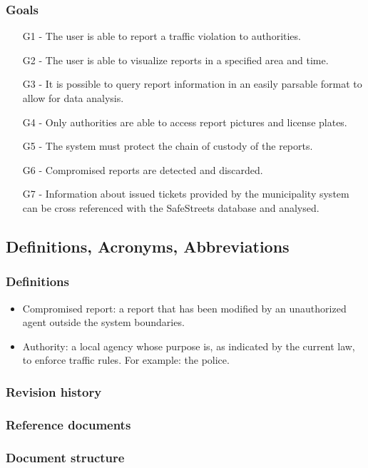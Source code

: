 \subsubsection{Goals}
\begin{itemize}
\item
[G1] - The user is able to report a traffic violation to authorities.
\item
[G2] - The user is able to visualize reports in a specified area and time.
\item
[G3] - It is possible to query report information in an easily parsable format to allow for data analysis.
\item
[G4] - Only authorities are able to access report pictures and license plates.
\item
[G5] - The system must protect the chain of custody of the reports. 
\item
[G6] - Compromised reports are detected and discarded.
\item
[G7] - Information about issued tickets provided by the municipality system can be cross referenced with the SafeStreets database and analysed.
\end{itemize}

\subsection{Definitions, Acronyms, Abbreviations}
\subsubsection{Definitions}
\begin{itemize}
    \item Compromised report: a report that has been modified by an unauthorized agent outside the system boundaries.
    \item Authority: a local agency whose purpose is, as indicated by the current law, to enforce traffic rules. For example: the police.      
\end{itemize}

\subsubsection{Revision history}
\subsubsection{Reference documents}
\subsubsection{Document structure}